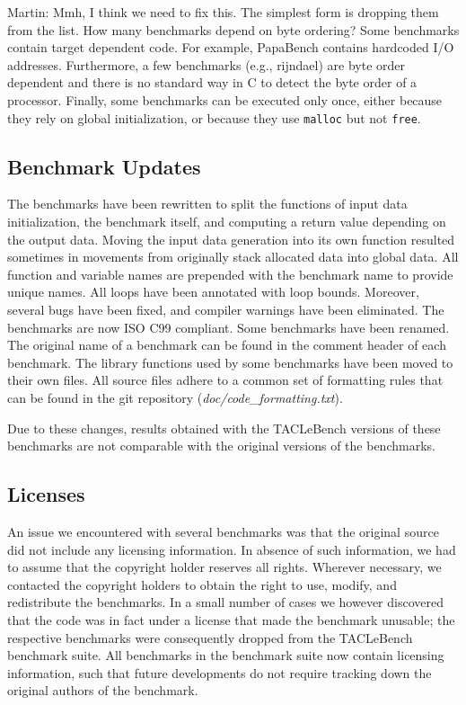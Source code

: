\documentclass[a4paper,UKenglish]{oasics}
\newcommand{\todo}[1]{{\emph{TODO: #1}}}
\newcommand{\martin}[1]{{\color{blue} Martin: #1}}
\newcommand{\code}[1]{{\small{\texttt{#1}}}}
\begin{document}
\martin{Mmh, I think we need to fix this. The simplest form is dropping them
from the list. How many benchmarks depend on byte ordering?}
Some benchmarks contain target dependent code.
For example, PapaBench contains hardcoded I/O addresses.
Furthermore, a few benchmarks (e.g., rijndael) are byte order dependent
and there is no standard way in C to detect the byte order of a processor.
Finally, some benchmarks can be executed only once, either because
they rely on global initialization, or because they use \code{malloc} but not \code{free}.


\subsection{Benchmark Updates}

The benchmarks have been rewritten to split the functions of
input data initialization, the benchmark itself, and computing a return
value depending on the output data. Moving the input data generation
into its own function resulted sometimes in movements from originally
stack allocated data into global data.
All function and variable names are prepended with the benchmark
name to provide unique names.
All loops have been annotated with loop bounds.
Moreover, several bugs have been fixed, and compiler warnings have been eliminated.
The benchmarks are now ISO C99 compliant.
Some benchmarks have been renamed. The original name of a benchmark can be found in the comment header of each benchmark.
The library functions used by some benchmarks have been moved to their own files.
All source files adhere to a common set of formatting rules that can be found in the git repository (\textit{doc/code\_formatting.txt}).


Due to these changes, results obtained with the TACLeBench versions
of these benchmarks are not comparable with the original versions of
the benchmarks.


\subsection{Licenses}

An issue we encountered with several benchmarks was that the original
source did not include any licensing information. In absence of such
information, we had to assume that the copyright holder reserves all
rights. Wherever necessary, we contacted the copyright holders to
obtain the right to use, modify, and redistribute the benchmarks. In a
small number of cases we however discovered that the code was in fact
under a license that made the benchmark unusable; the respective
benchmarks were consequently dropped from the TACLeBench benchmark
suite. All benchmarks in the benchmark suite now contain licensing
information, such that future developments do not require tracking
down the original authors of the benchmark.
\end{document}
